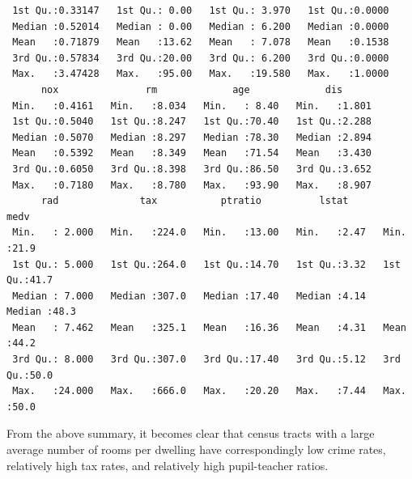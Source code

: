\begin{itemize}
\begin{lstlisting}
 1st Qu.:0.33147   1st Qu.: 0.00   1st Qu.: 3.970   1st Qu.:0.0000
 Median :0.52014   Median : 0.00   Median : 6.200   Median :0.0000
 Mean   :0.71879   Mean   :13.62   Mean   : 7.078   Mean   :0.1538
 3rd Qu.:0.57834   3rd Qu.:20.00   3rd Qu.: 6.200   3rd Qu.:0.0000
 Max.   :3.47428   Max.   :95.00   Max.   :19.580   Max.   :1.0000
      nox               rm             age             dis
 Min.   :0.4161   Min.   :8.034   Min.   : 8.40   Min.   :1.801
 1st Qu.:0.5040   1st Qu.:8.247   1st Qu.:70.40   1st Qu.:2.288
 Median :0.5070   Median :8.297   Median :78.30   Median :2.894
 Mean   :0.5392   Mean   :8.349   Mean   :71.54   Mean   :3.430
 3rd Qu.:0.6050   3rd Qu.:8.398   3rd Qu.:86.50   3rd Qu.:3.652
 Max.   :0.7180   Max.   :8.780   Max.   :93.90   Max.   :8.907
      rad              tax           ptratio          lstat           medv
 Min.   : 2.000   Min.   :224.0   Min.   :13.00   Min.   :2.47   Min.   :21.9
 1st Qu.: 5.000   1st Qu.:264.0   1st Qu.:14.70   1st Qu.:3.32   1st Qu.:41.7
 Median : 7.000   Median :307.0   Median :17.40   Median :4.14   Median :48.3
 Mean   : 7.462   Mean   :325.1   Mean   :16.36   Mean   :4.31   Mean   :44.2
 3rd Qu.: 8.000   3rd Qu.:307.0   3rd Qu.:17.40   3rd Qu.:5.12   3rd Qu.:50.0
 Max.   :24.000   Max.   :666.0   Max.   :20.20   Max.   :7.44   Max.   :50.0
        \end{lstlisting}
        From the above summary, it becomes clear that census tracts with a large
        average number of rooms per dwelling have correspondingly low crime rates,
        relatively high tax rates, and relatively high pupil-teacher ratios.
\end{itemize}
